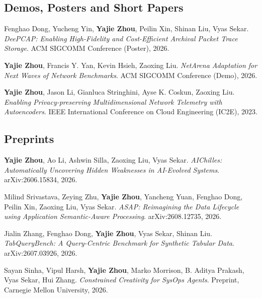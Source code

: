 \documentclass[11pt,letterpaper]{article}
\newcommand{\publication}[4]{%
  \item #1. \textit{#2}. #3, #4.
}
\begin{document}
\subsection{Demos, Posters and Short Papers}

\begin{enumerate}[label={[S\arabic*]},leftmargin=2.6em]
    \publication{Fenghao Dong, Yucheng Yin, \textbf{Yajie Zhou}, Peilin Xin, Shinan Liu, Vyas Sekar}
      {DeePCAP: Enabling High-Fidelity and Cost-Efficient Archival Packet Trace Storage}
      {ACM SIGCOMM Conference (Poster)}{2026}

    \publication{\textbf{Yajie Zhou}, Francis Y. Yan, Kevin Hsieh, Zaoxing Liu}
      {NetArena Adaptation for Next Waves of Network Benchmarks}
      {ACM SIGCOMM Conference (Demo)}{2026}

    \publication{\textbf{Yajie Zhou}, Jason Li, Gianluca Stringhini, Ayse K. Coskun, Zaoxing Liu}
      {Enabling Privacy-preserving Multidimensional Network Telemetry with Autoencoders}
      {IEEE International Conference on Cloud Engineering (IC2E)}{2023}
\end{enumerate}

\subsection{Preprints}

\begin{enumerate}[label={[R\arabic*]},leftmargin=2.6em]
    \publication{\textbf{Yajie Zhou}, Ao Li, Ashwin Silla, Zaoxing Liu, Vyas Sekar}
      {AIChilles: Automatically Uncovering Hidden Weaknesses in AI-Evolved Systems}
      {arXiv:2606.15834}{2026}

    \publication{Milind Srivastava, Zeying Zhu, \textbf{Yajie Zhou}, Yancheng Yuan, Fenghao Dong, Peilin Xin, Zaoxing Liu, Vyas Sekar}
      {ASAP: Reimagining the Data Lifecycle using Application Semantic-Aware Processing}
      {arXiv:2608.12735}{2026}

    \publication{Jialin Zhang, Fenghao Dong, \textbf{Yajie Zhou}, Vyas Sekar, Shinan Liu}
      {TabQueryBench: A Query-Centric Benchmark for Synthetic Tabular Data}
      {arXiv:2607.03926}{2026}

    \publication{Sayan Sinha, Vipul Harsh, \textbf{Yajie Zhou}, Marko Morrison, B. Aditya Prakash, Vyas Sekar, Hui Zhang}
      {Constrained Creativity for SysOps Agents}
      {Preprint, Carnegie Mellon University}{2026}
\end{enumerate}
\end{document}

